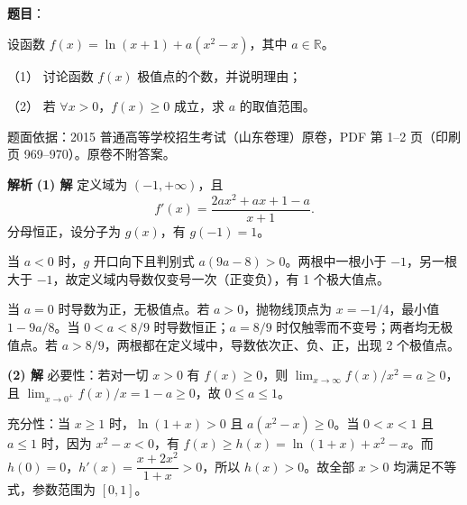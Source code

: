\begin{answer}

\textbf{题目}：

设函数 $f(x)=\ln(x+1)+a(x^2-x)$，其中 $a\in\mathbb{R}$。

（1） 讨论函数 $f(x)$ 极值点的个数，并说明理由；

（2） 若 $\forall x>0$，$f(x)\geqslant 0$ 成立，求 $a$ 的取值范围。

\par\medskip

\begin{gktip}
题面依据：2015 普通高等学校招生考试（山东卷理）原卷，PDF 第 1–2 页（印刷页 969–970）。原卷不附答案。
\end{gktip}

\textbf{解析}
\textbf{(1) 解}
定义域为 $(-1,+\infty)$，且
\nopagebreak[4]
\[
f'(x)=\frac{2ax^2+ax+1-a}{x+1}.
\]
分母恒正，设分子为 $g(x)$，有 $g(-1)=1$。

当 $a<0$ 时，$g$ 开口向下且判别式 $a(9a-8)>0$。两根中一根小于 $-1$，另一根大于 $-1$，故定义域内导数仅变号一次（正变负），有 1 个极大值点。

当 $a=0$ 时导数为正，无极值点。若 $a>0$，抛物线顶点为 $x=-1/4$，最小值 $1-9a/8$。当 $0<a<8/9$ 时导数恒正；$a=8/9$ 时仅触零而不变号；两者均无极值点。若 $a>8/9$，两根都在定义域中，导数依次正、负、正，出现 2 个极值点。

\textbf{(2) 解}
必要性：若对一切 $x>0$ 有 $f(x)\ge0$，则 $\lim_{x\to\infty}f(x)/x^2=a\ge0$，且 $\lim_{x\to0^+}f(x)/x=1-a\ge0$，故 $0\le a\le1$。

充分性：当 $x\ge1$ 时，$\ln(1+x)>0$ 且 $a(x^2-x)\ge0$。当 $0<x<1$ 且 $a\le1$ 时，因为 $x^2-x<0$，有 $f(x)\ge h(x)=\ln(1+x)+x^2-x$。而 $h(0)=0$，$h'(x)=\dfrac{x+2x^2}{1+x}>0$，所以 $h(x)>0$。故全部 $x>0$ 均满足不等式，参数范围为 $[0,1]$。



\end{answer}